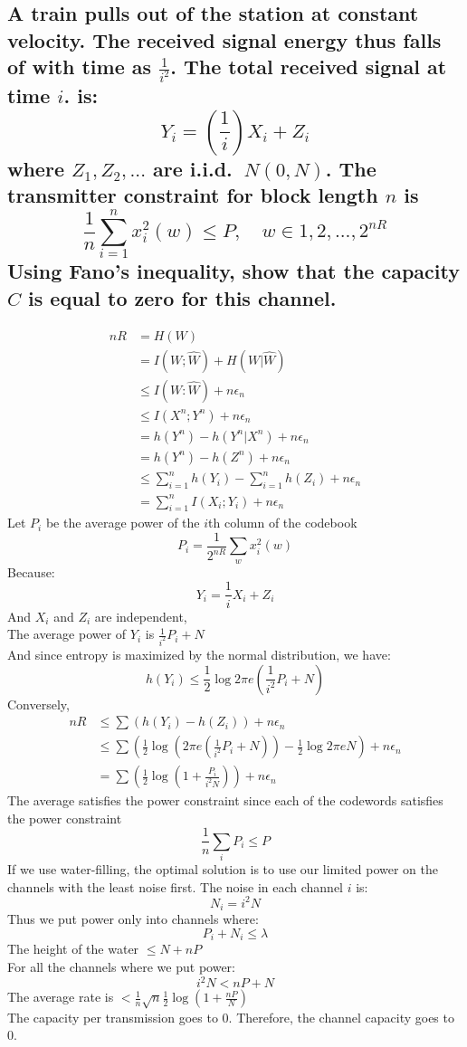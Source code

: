 \documentclass[11pt, oneside]{book}   	%
\begin{document}
\subsection*{A train pulls out of the station at constant velocity.  The received signal energy thus falls of with time as $\frac{1}{i^2}$.  The total received signal at time $i$. is: $$Y_i=(\frac{1}{i})X_i+Z_i$$ where $Z_1, Z_2,...$ are i.i.d. $~ N(0,N)$.  The transmitter constraint for block length $n$ is $$\frac{1}{n}\sum_{i=1}^{n} x_i^2 (w) \leq P, \quad w \in {1,2,...,2^{nR}}$$ Using Fano's inequality, show that the capacity $C$ is equal to zero for this channel.}
\begin{equation}
\begin{split}
	nR & = H(W)\\
	& = I(W;\hat{W}) + H(W|\hat{W})\\
	& \leq I(W:\hat{W}) + n\epsilon_n\\
	& \leq I(X^n;Y^n) + n\epsilon_n\\
	& = h(Y^n) - h(Y^n|X^n) + n\epsilon_n\\
	& = h(Y^n) - h(Z^n) + n\epsilon_n\\
	& \leq \sum_{i=1}^n h(Y_i) - \sum_{i=1}^n h(Z_i) + n\epsilon_n\\
	& = \sum_{i=1}^n I(X_i;Y_i) + n\epsilon_n
\end{split}
\end{equation}
Let $P_i$ be the average power of the $i$th column of the codebook
$$P_i = \frac{1}{2^{nR}} \sum_w x_i^2(w)$$
Because:
$$Y_i=\frac{1}{i}X_i+Z_i$$
And $X_i$ and $Z_i$ are independent,\\
The average power of $Y_i$ is $\frac{1}{i^2}P_i + N$\\
And since entropy is maximized by the normal distribution, we have:
$$h(Y_i) \leq \frac{1}{2}\log{2\pi e}(\frac{1}{i^2}P_i + N)$$
Conversely,
\begin{equation}
\begin{split}
	nR & \leq \sum(h(Y_i) - h(Z_i) ) + n\epsilon_n\\
	& \leq \sum(\frac{1}{2}\log{(2 \pi e(\frac{1}{i^2}P_i + N)) - \frac{1}{2}\log{2 \pi e N}}) + n\epsilon_n\\
	& = \sum( \frac{1}{2}\log{(1 + \frac{P_i}{i^2N})}) + n\epsilon_n
\end{split}
\end{equation}
The average satisfies the power constraint since each of the codewords satisfies the power constraint
$$\frac{1}{n}\sum_i P_i \leq P$$
If we use water-filling, the optimal solution is to use our limited power on the channels with the least noise first.  The noise in each channel $i$ is: 
$$N_i = i^2 N$$
Thus we put power only into channels where:
$$P_i + N_i \leq \lambda$$
The height of the water $\leq N + nP$\\
For all the channels where we put power:
$$i^2N < nP + N$$
The average rate is $< \frac{1}{n} \sqrt{n}\frac{1}{2}\log(1+\frac{nP}{N})$\\
The capacity per transmission goes to 0.
Therefore, the channel capacity goes to 0.
\end{document}
